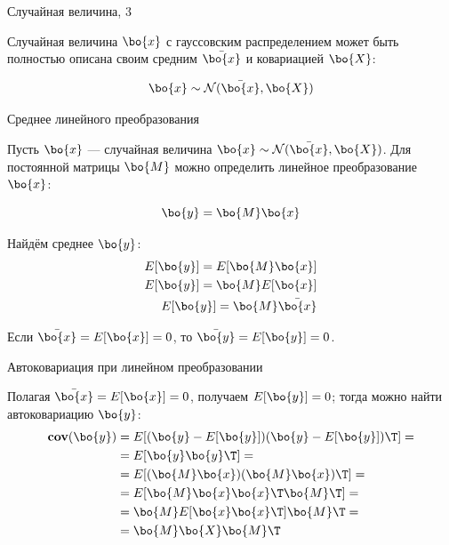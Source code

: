 \documentclass{beamer}
\begin{document}
\begin{frame}{Случайная величина, 3}
	\begin{flushleft}
		
		Случайная величина $\bo{x}$ с гауссовским распределением может быть полностью описана своим средним $\bar{\bo{x}}$ и ковариацией $\bo{X}$:
		
		\begin{equation}
			\bo{x} \sim \mathcal{N} (\bar{\bo{x}}, \bo{X})
		\end{equation}
		
		
	\end{flushleft}
\end{frame}


\begin{frame}{Среднее линейного преобразования}
	\begin{flushleft}
		
		Пусть $\bo{x}$ — случайная величина $\bo{x} \sim \mathcal{N} (\bar{\bo{x}}, \bo{X})$. Для постоянной матрицы $\bo{M}$ можно определить линейное преобразование $\bo{x}$:
		
		\begin{equation}
			\bo{y} = \bo{M}\bo{x}
		\end{equation}
		
		Найдём среднее $\bo{y}$:
		\begin{align}
			E[\bo{y}] = E[\bo{M}\bo{x}] \\
			E[\bo{y}] = \bo{M}E[\bo{x}] \\
			E[\bo{y}] = \bo{M}\bar{\bo{x}}
		\end{align}
		
		Если $\bar{\bo{x}} = E[\bo{x}] = 0$, то $\bar{\bo{y}} = E[\bo{y}] = 0$.
		
	\end{flushleft}
\end{frame}



\begin{frame}{Автоковариация при линейном преобразовании}
	\begin{flushleft}
		
		Полагая $\bar{\bo{x}} = E[\bo{x}] = 0$, получаем $E[\bo{y}] = 0$; тогда можно найти автоковариацию $\bo{y}$:
		\begin{align*}
			\textbf{cov}(\bo{y}) &= E[(\bo{y} - E[\bo{y}])(\bo{y} - E[\bo{y}])\T] =
			\\
			&=E[\bo{y}\bo{y}\T] =
			\\
			&=E[(\bo{M}\bo{x})(\bo{M}\bo{x})\T]=
			\\
			&=E[\bo{M}\bo{x}\bo{x}\T \bo{M}\T]=
			\\
			&=\bo{M}E[\bo{x}\bo{x}\T ]\bo{M}\T=
			\\
			&=\bo{M}\bo{X} \bo{M}\T
		\end{align*}
		
	\end{flushleft}
\end{frame}
\end{document}
